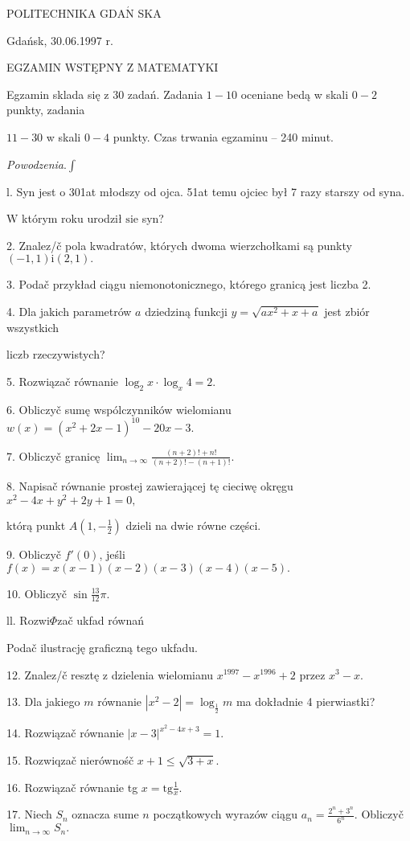 \documentclass[a4paper,12pt]{article}
\begin{document}
POLITECHNIKA $\mathrm{G}\mathrm{D}\mathrm{A}\acute{\mathrm{N}}$ SKA

Gdańsk, 30.06.1997 r.

EGZAMIN WSTĘPNY Z MATEMATYKI

Egzamin sklada się z 30 zadań. Zadania $1-10$ oceniane bedą w skali $0-2$ punkty, zadania

$11-30$ w skali $0-4$ punkty. Czas trwania egzaminu -- 240 minut.

{\it Powodzenia}.$\displaystyle \int$

l. Syn jest o 301at młodszy od ojca. 51at temu ojciec był 7 razy starszy od syna.

$\mathrm{W}$ którym roku urodził $\mathrm{s}\mathrm{i}\mathrm{e}$ syn?

2. Znalez/č pola kwadratów, których dwoma wierzchołkami są punkty $(-1,1)\mathrm{i}(2,1).$

3. Podač przykład ciągu niemonotonicznego, którego granicą jest liczba 2.

4. Dla jakich parametrów $a$ dziedziną funkcji $y = \sqrt{ax^{2}+x+a}$ jest zbiór wszystkich

liczb rzeczywistych?

5. Rozwiązač równanie $\log_{2}x\cdot\log_{x}4=2.$

6. Obliczyč sumę wspólczynników wielomianu $w(x)=(x^{2}+2x-1)^{10}-20x-3.$

7. Obliczyč granicę $\displaystyle \lim_{n\rightarrow\infty}\frac{(n+2)!+n!}{(n+2)!-(n+1)!}.$

8. Napisač równanie prostej zawierającej tę cieciwę okręgu $x^{2}-4x+y^{2}+2y+1 =0,$

którą punkt $A(1,-\displaystyle \frac{1}{2})$ dzieli na dwie równe części.

9. Obliczyč $f'(0)$, jeśli $f(x)=x(x-1)(x-2)(x-3)(x-4)(x-5).$

10. Obliczyč $\displaystyle \sin\frac{13}{12}\pi.$

ll. Rozwi$\Phi$zač ukfad równań 

Podač ilustrację graficzną tego ukfadu.

12. Znalez/č resztę z dzielenia wielomianu $x^{1997}-x^{1996}+2$ przez $x^{3}-x.$

13. Dla jakiego $m$ równanie $|x^{2}-2|=\log_{\frac{1}{2}}m$ ma dokładnie 4 pierwiastki?

14. Rozwiązač równanie $|x-3|^{x^{2}-4x+3}=1.$

15. Rozwiqzač nierównośč $x+1\leq\sqrt{3+x}.$

16. Rozwiązač równanie tg $x=\displaystyle \mathrm{t}\mathrm{g}\frac{1}{x}.$

17. Niech $S_{n}$ oznacza sume $n$ początkowych wyrazów ciągu $a_{n}=\displaystyle \frac{2^{n}+3^{n}}{6^{n}}.$ Obliczyč $\displaystyle \lim_{n\rightarrow\infty}S_{n}.$
\end{document}

